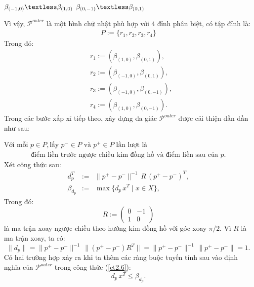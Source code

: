 \documentclass[12pt,a4paper,openany,oneside]{report}
\begin{document}
\begin{center}
	$\beta_{(-1, 0)} \textless \beta_{(1, 0)}$  $\beta_{(0, -1)} \textless \beta_{(0, 1)}$
\end{center}
Vì vậy, $\mathcal{P}^{outer}$ là một hình chữ nhật phù hợp với 4 đỉnh phân biệt, có tập đỉnh là:
\begin{align}\label{ct2.10}
	P := \{r_1, r_2, r_3, r_4\}
\end{align}
Trong đó:
\begin{equation}\label{ct2.11}
	\begin{aligned}
		& r_1:=\left(\beta_{(1,0)}, \beta_{(0,1)}\right), \\
		& r_2:=\left(\beta_{(-1,0)}, \beta_{(0,1)}\right), \\
		& r_3:=\left(\beta_{(-1,0)}, \beta_{(0,-1)}\right), \\
		& r_4:=\left(\beta_{(1,0)}, \beta_{(0,-1)}\right) .
	\end{aligned}
\end{equation}
Trong các bước xấp xỉ tiếp theo, xây dựng đa giác $\mathcal{P}^{outer}$ được cải thiện dần dần như sau:

$\text{Với mỗi }p \in P, \text{lấy } p^{-} \in P \text{ và } p^{+} \in P \text{ lần lượt là}$
\begin{align} \label{ct2.12}
\text {điểm liền trước ngược chiều kim đồng hồ và điểm liền sau của } p.
\end{align}
Xét công thức sau:
\begin{equation}\label{ct2.13}
	\begin{array}{lcl}
		d_{p}^T &:=& \|p^+ - p^-\|^{-1}\, R \, (p^+ - p^-)^T, \\
		\beta_{d_{p}} &:=& \max\{d_{p}\, x^T \mid x \in X\},
	\end{array}
\end{equation}
Trong đó:
\begin{equation}\label{ct2.14}
	R := \begin{pmatrix}
		0 & -1 \\
		1 & 0
	\end{pmatrix}
\end{equation}
là ma trận xoay ngược chiều theo hướng kim đồng hồ với góc xoay $\pi/2$. Vì $R$ là ma trận xoay, ta có:
\begin{equation}\label{ct2.15}
	\|d_{p}\| = \|p^+ - p^-\|^{-1}\, \|(p^+ - p^-) R^T\| = \|p^+ - p^-\|^{-1}\, \|p^+ - p^-\| = 1.
\end{equation}
Có hai trường hợp xảy ra khi ta thêm các ràng buộc tuyến tính sau vào định nghĩa của $\mathcal{P}^{outer}$ trong công thức (\ref{ct2.6}):
\begin{equation}\label{ct2.16}
	d_p\, x^T \leq \beta_{d_p}.
\end{equation}
\end{document}
